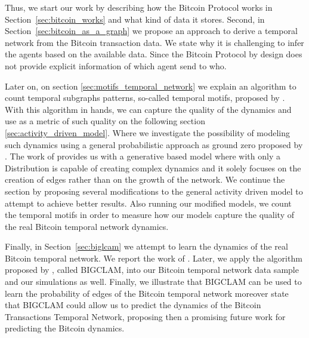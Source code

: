 \documentclass[12pt, %
abstract=on %
]{scrreprt} %
\theoremstyle{definition}
\theoremstyle{remark}
\begin{document}
Thus, we start our work by describing how the Bitcoin Protocol works in Section~\ref{sec:bitcoin_works} and what kind of data it stores. Second, in Section~\ref{sec:bitcoin_as_a_graph} we propose an approach to derive a temporal network from the Bitcoin transaction data. We state why it is challenging to infer the agents based on the available data. Since the Bitcoin Protocol by design does not provide explicit information of which agent send to who.

Later on, on section \ref{sec:motifs_temporal_network} we explain an algorithm to count temporal subgraphs patterns, so-called temporal motifs, proposed by \citeauthor{temporalMotifs}\cite{temporalMotifs}. With this algorithm in hands, we can capture the quality of the dynamics and use as a metric of such quality on the following section \ref{sec:activity_driven_model}. Where we investigate the possibility of modeling such dynamics using a general probabilistic approach as ground zero proposed by \citeauthor{perra2012activity}\cite{perra2012activity}. The work of \citeauthor{perra2012activity} provides us with a generative based model where with only a Distribution is capable of creating complex dynamics and it solely focuses on the creation of edges rather than on the growth of the network. We continue the section by proposing several modifications to the general activity driven model to attempt to achieve better results. Also running our modified models, we count the temporal motifs in order to measure how our models capture the quality of the real Bitcoin temporal network dynamics. 

Finally, in Section~\ref{sec:biglcam} we attempt to learn the dynamics of the real Bitcoin temporal network. We report the work of \citeauthor{yang2013overlapping} \cite{yang2013overlapping}. Later, we apply the algorithm proposed by \citeauthor{yang2013overlapping}, called BIGCLAM, into our Bitcoin temporal network data sample and our simulations as well. Finally, we illustrate that BIGCLAM can be used to learn the probability of edges of the Bitcoin temporal network moreover state that BIGCLAM could allow us to predict the dynamics of the Bitcoin Transactions Temporal Network, proposing then a promising future work for predicting the Bitcoin dynamics. 
     
	
	
    \tableofcontents
    
    \listoffigures

\end{document}

